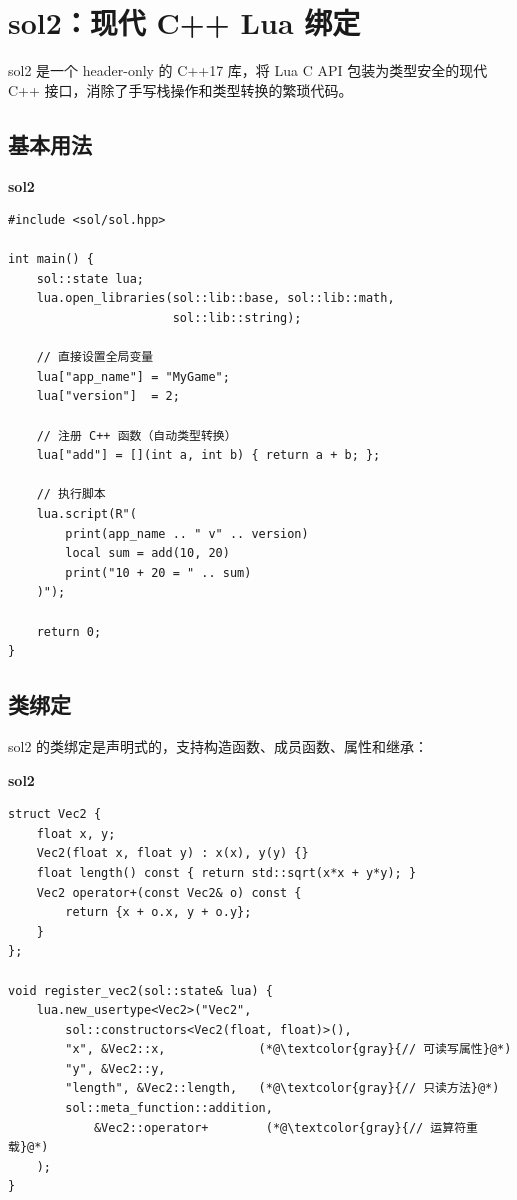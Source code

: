 \documentclass[12pt,a4paper,fontset=fandol]{ctexbook}
\newcommand{\sollabel}{%
  \noindent\begin{tcolorbox}[colback=solheadbg,coltext=white,
    sharp corners,boxrule=0pt,width=4.5em,height=1.4em,
    halign=center,valign=center,nobeforeafter,left=0pt,right=0pt,
    top=0pt,bottom=0pt]\small\bfseries sol2\end{tcolorbox}}
\begin{document}
\chapter{sol2：现代 C++ Lua 绑定}\label{ch:sol2}

sol2 是一个 header-only 的 C++17 库，将 Lua C API 包装为类型安全的现代 C++ 接口，消除了手写栈操作和类型转换的繁琐代码。

\section{基本用法}\label{sec:sol2-basic}

\sollabel
\begin{lstlisting}[style=cppstyle]
#include <sol/sol.hpp>

int main() {
    sol::state lua;
    lua.open_libraries(sol::lib::base, sol::lib::math,
                       sol::lib::string);

    // 直接设置全局变量
    lua["app_name"] = "MyGame";
    lua["version"]  = 2;

    // 注册 C++ 函数（自动类型转换）
    lua["add"] = [](int a, int b) { return a + b; };

    // 执行脚本
    lua.script(R"(
        print(app_name .. " v" .. version)
        local sum = add(10, 20)
        print("10 + 20 = " .. sum)
    )");

    return 0;
}
\end{lstlisting}

\section{类绑定}\label{sec:sol2-class}

sol2 的类绑定是声明式的，支持构造函数、成员函数、属性和继承：

\sollabel
\begin{lstlisting}[style=cppstyle]
struct Vec2 {
    float x, y;
    Vec2(float x, float y) : x(x), y(y) {}
    float length() const { return std::sqrt(x*x + y*y); }
    Vec2 operator+(const Vec2& o) const {
        return {x + o.x, y + o.y};
    }
};

void register_vec2(sol::state& lua) {
    lua.new_usertype<Vec2>("Vec2",
        sol::constructors<Vec2(float, float)>(),
        "x", &Vec2::x,             (*@\textcolor{gray}{// 可读写属性}@*)
        "y", &Vec2::y,
        "length", &Vec2::length,   (*@\textcolor{gray}{// 只读方法}@*)
        sol::meta_function::addition,
            &Vec2::operator+        (*@\textcolor{gray}{// 运算符重载}@*)
    );
}
\end{lstlisting}
\end{document}
